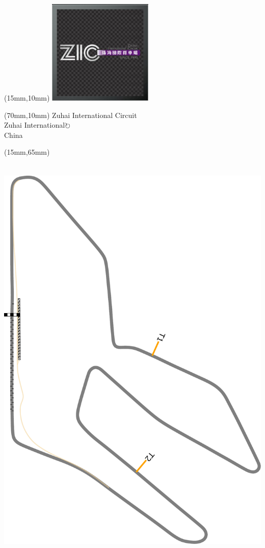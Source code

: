 \null\newpage
\begin{textblock*}{50mm}(15mm,10mm)%
\includegraphics[width=50mm]{LG/2015-05-20_00099.png}
\end{textblock*}
\begin{textblock*}{130mm}(70mm,10mm)%
{\fontsize{20}{20}\selectfont Zuhai International Circuit\\}
{\fontsize{16}{16}\selectfont Zuhai International\hfill \Large$\circlearrowright$\\}
{\fontsize{12}{12}\selectfont China\\}
\end{textblock*}
\begin{textblock*}{185mm}(15mm,65mm)%
\centering
\mbox{\includegraphics[width=185mm,height=210mm,keepaspectratio]{PT/ZUIC.pdf}}
\end{textblock*}
